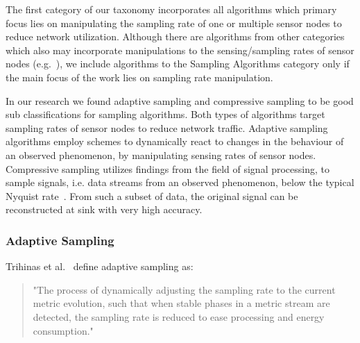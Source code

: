 The first category of our taxonomy incorporates all algorithms which primary
focus lies on manipulating the sampling rate of one or multiple sensor nodes to
reduce network utilization. Although there are algorithms from other categories
which also may incorporate manipulations to the sensing/sampling rates of
sensor nodes (e.g.~\cite{trihinas2015adam, chatterjea2008adaptive}), we include
algorithms to the Sampling Algorithms category only if the main focus of the
work lies on sampling rate manipulation. 


In our research we found adaptive sampling and compressive sampling to be good
sub classifications for sampling algorithms. Both types of algorithms target
sampling rates of sensor nodes to reduce network traffic. Adaptive sampling
algorithms employ schemes to dynamically react to changes in the behaviour of
an observed phenomenon, by manipulating sensing rates of sensor nodes.
Compressive sampling utilizes findings from the field of signal processing, to
sample signals, i.e. data streams from an observed phenomenon, below the
typical Nyquist rate~\cite{candes2008introduction}. From such a subset of data,
the original signal can be reconstructed at sink with very high accuracy.

\subsubsection{Adaptive Sampling}
\label{sec:Adaptive Sampling}

Trihinas et al.~\cite{trihinas2015adam} define adaptive sampling as:

\begin{quote}
    "The process of dynamically adjusting the sampling rate to the current
    metric evolution, such that when stable phases in a metric stream are
    detected, the sampling rate is reduced to ease processing and energy
    consumption."
\end{quote}

